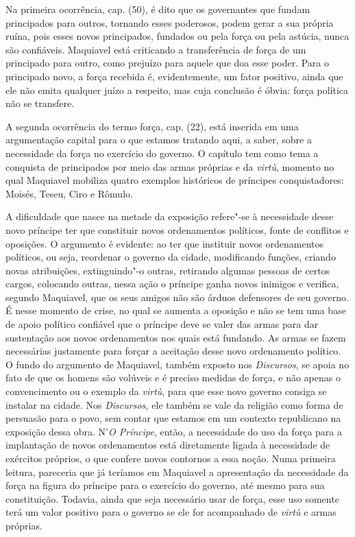 Na primeira ocorrência, cap.  (50), é dito que os governantes que
fundam principados para outros, tornando esses poderosos, podem gerar a
sua própria ruína, pois esses novos principados, fundados ou pela força
ou pela astúcia, nunca são confiáveis. Maquiavel está criticando a
transferência de força de um principado para outro, como prejuízo para
aquele que doa esse poder. Para o principado novo, a força recebida é,
evidentemente, um fator positivo, ainda que ele não emita qualquer juízo
a respeito, mas cuja conclusão é óbvia: força política não se transfere.

A segunda ocorrência do termo força, cap.  (22), está inserida em uma
argumentação capital para o que estamos tratando aqui, a saber, sobre a
necessidade da força no exercício do governo. O capítulo tem como tema a
conquista de principados por meio das armas próprias e da \emph{virtù},
momento no qual Maquiavel mobiliza quatro exemplos históricos de
príncipes conquistadores: Moisés, Teseu, Ciro e Rômulo.

A dificuldade que nasce na metade da exposição refere"-se à necessidade
desse novo príncipe ter que constituir novos ordenamentos políticos,
fonte de conflitos e oposições. O argumento é evidente: ao ter que
instituir novos ordenamentos políticos, ou seja, reordenar o governo da
cidade, modificando funções, criando novas atribuições, extinguindo"-o
outras, retirando algumas pessoas de certos cargos, colocando outras,
nessa ação o príncipe ganha novos inimigos e verifica, segundo
Maquiavel, que os seus amigos não são árduos defensores de seu governo.
É nesse momento de crise, no qual se aumenta a oposição e não se tem uma
base de apoio político confiável que o príncipe deve se valer das armas
para dar sustentação aos novos ordenamentos nos quais está fundando. As
armas se fazem necessárias justamente para forçar a aceitação desse novo
ordenamento político. O fundo do argumento de Maquiavel, também exposto
nos \emph{Discursos}, se apoia no fato de que os homens são volúveis e é
preciso medidas de força, e não apenas o convencimento ou o exemplo da
\emph{virtù}, para que esse novo governo consiga se instalar na cidade.
Nos \emph{Discursos,} ele também se vale da religião como forma de
persuasão para o povo, sem contar que estamos em um contexto republicano
na exposição dessa obra. N'\emph{O Príncipe}, então, a necessidade do
uso da força para a implantação de novos ordenamentos está diretamente
ligada à necessidade de exércitos próprios, o que confere novos
contornos a essa noção. Numa primeira leitura, pareceria que já teríamos
em Maquiavel a apresentação da necessidade da força na figura do
príncipe para o exercício do governo, até mesmo para sua constituição.
Todavia, ainda que seja necessário usar de força, esse uso somente terá
um valor positivo para o governo se ele for acompanhado de \emph{virtù}
e armas próprias.

